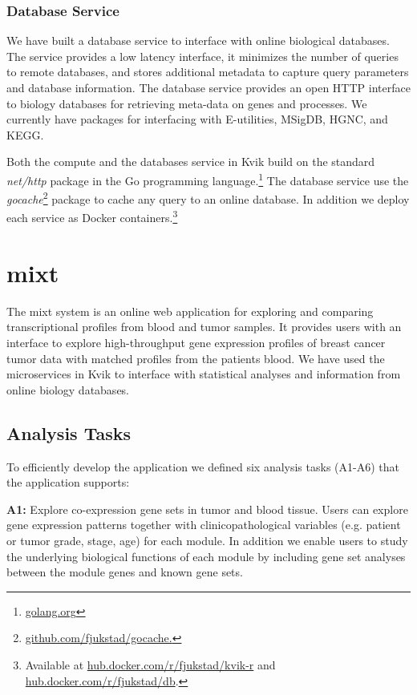 \subsubsection{Database Service} 
We have built a database service to interface with online biological databases.
The service provides a low latency interface, it minimizes the number of queries
to remote databases, and stores additional metadata to capture query parameters
and database information.  The database service provides an open HTTP interface
to biology databases for retrieving meta-data on genes and processes.  We
currently have packages for interfacing with E-utilities\cite{sayers2009entrez},
MSigDB, HGNC\cite{gray2014genenames}, and KEGG.

Both the compute and the databases service in Kvik build on the standard
\emph{net/http} package in the Go programming
language.\footnote{\url{golang.org}} The database service use
the \emph{gocache}\footnote{\url{github.com/fjukstad/gocache.}} package to cache
any query to an online database. In addition we deploy each service as Docker
containers.\footnote{Available at \url{hub.docker.com/r/fjukstad/kvik-r} and
\url{hub.docker.com/r/fjukstad/db}.}

\section{\gls{mixt}}
The \gls{mixt} system is an online web application for exploring and comparing
transcriptional profiles from blood and tumor samples. It provides users with an
interface to explore high-throughput gene expression profiles of breast cancer
tumor data with matched profiles from the patients blood. We have used the
microservices in Kvik to interface with statistical analyses and information
from online biology databases. 

\subsection{Analysis Tasks} 
To efficiently develop
the application we defined six analysis tasks (A1-A6) that the application
supports: 

\textbf{A1:} Explore co-expression gene sets in tumor and blood tissue.  Users
can explore gene expression patterns together with clinicopathological variables
(e.g. patient or tumor grade, stage, age) for each module.  In addition we
enable users to study the underlying biological functions of each module by
including gene set analyses between the module genes and known gene sets. 

